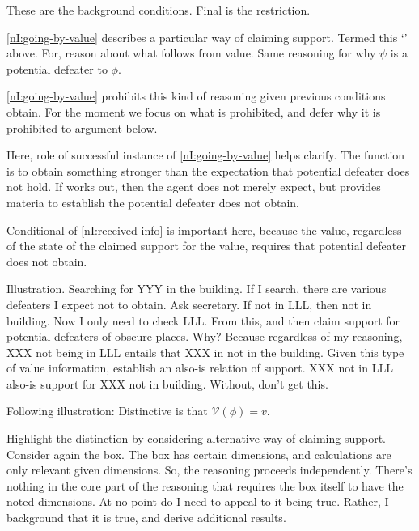 \begin{note}
  These are the background conditions.
  Final is the restriction.
\end{note}

\begin{note}[~\ref{nI:going-by-value}]
  \ref{nI:going-by-value} describes a particular way of claiming support.
  Termed this `\RBV{-}' above.
  For, reason about what follows from value.
  Same reasoning for why \(\psi\) is a potential defeater to \(\phi\).

  \ref{nI:going-by-value} prohibits this kind of reasoning given previous conditions obtain.
  For the moment we focus on what is prohibited, and defer why it is prohibited to argument below.

  Here, role of successful instance of \ref{nI:going-by-value} helps clarify.
  The function is to obtain something stronger than the expectation that potential defeater does not hold.
  If \RBV{} works out, then the agent does not merely expect, but provides materia to establish the potential defeater does not obtain.

  Conditional of \ref{nI:received-info} is important here, because the value, regardless of the state of the claimed support for the value, requires that potential defeater does not obtain.

  Illustration.
  Searching for YYY in the building.
  If I search, there are various defeaters I expect not to obtain.
  Ask secretary.
  If not in LLL, then not in building.
  Now I only need to check LLL.
  From this, \RBV{} and then claim support for potential defeaters of obscure places.
  Why?
  Because regardless of my reasoning, XXX not being in LLL entails that XXX in not in the building.
  Given this type of value information, establish an also-is relation of support.
  XXX not in LLL also-is support for XXX not in building.
  Without, don't get this.

  Following illustration:
  Distinctive is that \(\mathcal{V}(\phi) = v\).

  Highlight the distinction by considering alternative way of claiming support.
  Consider again the box.
  The box has certain dimensions, and calculations are only relevant given dimensions.
  So, the reasoning proceeds independently.
  There's nothing in the core part of the reasoning that requires the box itself to have the noted dimensions.
  At no point do I need to appeal to it being true.
  Rather, I background that it is true, and derive additional results.


\end{note}
